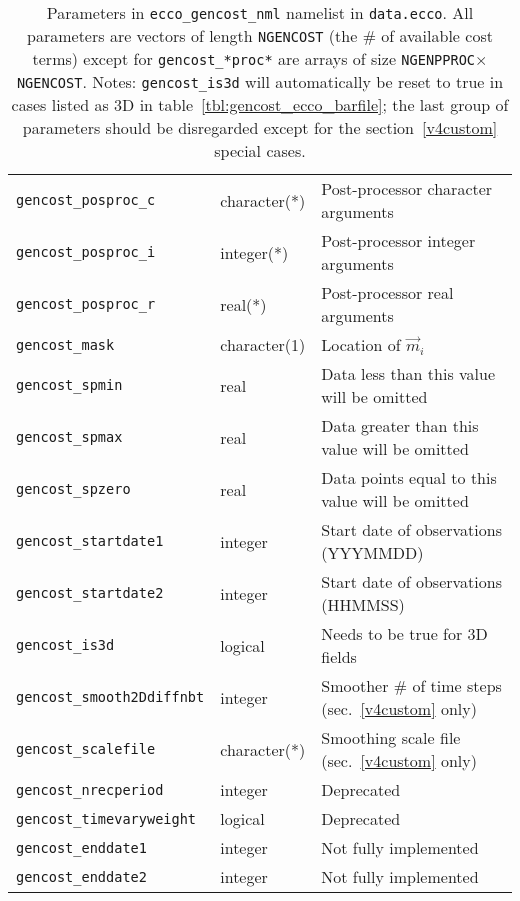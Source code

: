 \begin{table}[!ht]
\begin{tabular}{lll}
\texttt{gencost\_posproc\_c} 	&	character(*)	&	Post-processor character arguments 	\\
\texttt{gencost\_posproc\_i} 	&	integer(*) 		&	Post-processor integer arguments 	\\
\texttt{gencost\_posproc\_r} 	&	real(*)			&	Post-processor real arguments 	\\
\hline
\texttt{gencost\_mask}		&	character(1)	&	Location of $\vec{m}_i$\\
\texttt{gencost\_spmin}		&	real			&	Data less than this value will be omitted \\
\texttt{gencost\_spmax}		&	real			&	Data greater than this value will be omitted \\
\texttt{gencost\_spzero}		&	real			&	Data points equal to this value will be omitted \\
\texttt{gencost\_startdate1} 	&	integer			&	Start date of observations (YYYMMDD)	\\
\texttt{gencost\_startdate2} 	&	integer			&	Start date of observations (HHMMSS)				\\
\texttt{gencost\_is3d}		&	logical 		&	Needs to be true for 3D fields \\
\hline
\texttt{gencost\_smooth2Ddiffnbt} &integer		&	Smoother \# of time steps (sec.~\ref{v4custom} only)
\\
\texttt{gencost\_scalefile}	&	character(*)	&	Smoothing scale file (sec.~\ref{v4custom} only)
\\
\texttt{gencost\_nrecperiod} 	&	integer		&	Deprecated	\\
\texttt{gencost\_timevaryweight}&	logical 		&	Deprecated	\\
\texttt{gencost\_enddate1} 		&	integer	&	Not fully implemented \\
\texttt{gencost\_enddate2} 		&	integer	&	Not fully implemented \\
\end{tabular}
\caption{Parameters in \texttt{ecco\_gencost\_nml} namelist in \texttt{data.ecco}. All parameters are vectors of length \texttt{NGENCOST} (the \# of available cost terms) except for \texttt{gencost\_*proc*} are arrays of size \texttt{NGENPPROC}$\times$\texttt{NGENCOST}. Notes: \texttt{gencost\_is3d} will automatically be reset to true in cases listed as 3D in table~\ref{tbl:gencost_ecco_barfile}; the last group of parameters should be disregarded except for the section~\ref{v4custom} special cases.}
\label{tbl:gencost_ecco_params}
\end{table}

